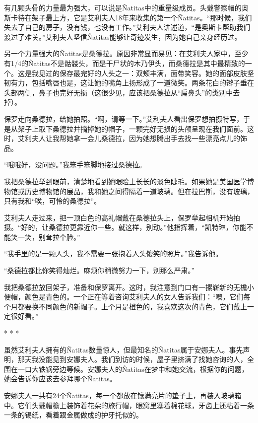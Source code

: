 \documentclass[12pt,oneside]{book}
\begin{document}
\begin{bookref}[frametitle={\cite{好好告别：世界葬礼观察手记}}]
有几颗头骨的力量最为强大，可以说是Ñatitas中的重量级成员。头戴警察帽的奥斯卡待在架子最上方，它是艾利夫人18年来收集的第一个Ñatitas。“那时候，我们失去了自己的房子，没有钱，也没有工作。”艾利夫人讲述道，“是奥斯卡帮助我们渡过了难关。”艾利夫人坚信Ñatitas能够让奇迹发生，因为她自己亲身经历过。

另一个力量强大的Ñatitas是桑德拉。原因非常显而易见：在艾利夫人家中，至少有1/4的Ñatitas不是骷髅头，而是干尸状的木乃伊头，而桑德拉是其中最精致的一个。这是我见过的保存最完好的人头之一：双颊丰满，面带笑容。她的面部皮肤坚韧有力，包括嘴唇也是，这让她的嘴角上扬形成了一道微笑。两条花白的辫子垂在头部两侧，鼻子也完好无损（这很少见，应该把桑德拉从“扁鼻头”的类别中去掉）。

保罗走向桑德拉，给她拍照。“啊，请等一下。”艾利夫人看出保罗想拍摄特写，于是从架子上取下桑德拉并摘掉她的帽子，一颗完好无损的头颅呈现在我们面前。这时，艾利夫人让我帮她拿一会儿桑德拉，因为她想腾出手去找一些漂亮点儿的饰品。

“哦哦好，没问题。”我笨手笨脚地接过桑德拉。

我把桑德拉举到眼前，清楚地看到她眼睑上长长的淡色睫毛。如果她是美国医学博物馆或历史博物馆的展品，我和她之间得隔着一道玻璃。但在拉巴斯，没有玻璃，只有我和“唉，可怜的桑德拉”。

艾利夫人走过来，把一顶白色的高礼帽戴在桑德拉头上，保罗举起相机开始拍摄。“好的，让桑德拉更靠近你一些。就这样，别动。”他指挥着，“凯特琳，你能不能笑一笑，别耷拉个脸。”

“我手里的是一颗人头，我不需要一张抱着人头傻笑的照片。”我告诉他。

“桑德拉都比你笑得灿烂。麻烦你稍微努力一下，别那么严肃。”

我把桑德拉放回架子，准备和保罗离开。这时，我注意到门口有一摞崭新的无檐小便帽，颜色是青色的。一个正在等着咨询艾利夫人的女人告诉我们：“噢，它们每个月都要换不同颜色的新帽子。上个月是橙色的，我喜欢这次的青色，它们戴上一定很好看。”

\begin{center}
* * *
\end{center}

虽然艾利夫人拥有的Ñatitas数量惊人，但最知名的Ñatitas属于安娜夫人。事先声明，那天我没能见到安娜夫人。我们到访的时候，屋子里挤满了找她咨询的人，全围在一口大铁锅旁边等候。安娜夫人的Ñatitas在梦中和她交流，根据你的问题，她会告诉你应该去参拜哪个Ñatitas。

安娜夫人一共有24个Ñatitas，每一个都放在镶满亮片的垫子上，再装入玻璃箱中。它们头戴帽檐上装饰着花朵的旅行帽，眼窝里塞着棉花球，牙齿上还粘着一条一条的锡纸，看着跟金属做成的护牙托似的。


\end{bookref}
\end{document}

